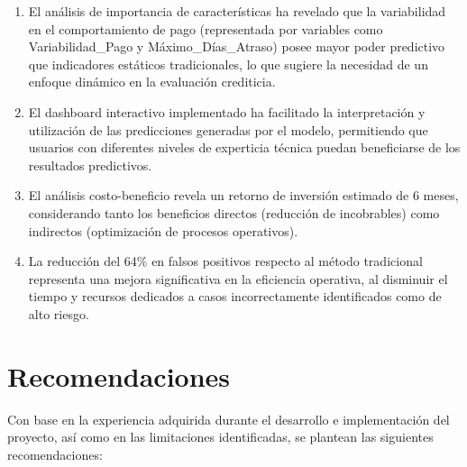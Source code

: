 \begin{enumerate}
    \item El análisis de importancia de características ha revelado que la variabilidad en el comportamiento de pago (representada por variables como Variabilidad\_Pago y Máximo\_Días\_Atraso) posee mayor poder predictivo que indicadores estáticos tradicionales, lo que sugiere la necesidad de un enfoque dinámico en la evaluación crediticia.
    
    \item El dashboard interactivo implementado ha facilitado la interpretación y utilización de las predicciones generadas por el modelo, permitiendo que usuarios con diferentes niveles de experticia técnica puedan beneficiarse de los resultados predictivos.
    
    \item El análisis costo-beneficio revela un retorno de inversión estimado de 6 meses, considerando tanto los beneficios directos (reducción de incobrables) como indirectos (optimización de procesos operativos).
    
    \item La reducción del 64\% en falsos positivos respecto al método tradicional representa una mejora significativa en la eficiencia operativa, al disminuir el tiempo y recursos dedicados a casos incorrectamente identificados como de alto riesgo.
\end{enumerate}

\section{Recomendaciones}

Con base en la experiencia adquirida durante el desarrollo e implementación del proyecto, así como en las limitaciones identificadas, se plantean las siguientes recomendaciones:

